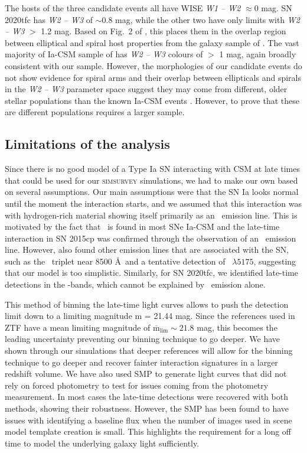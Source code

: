 \documentclass[a4paper,oneside,12pt, class=Latex/Classes/PhDthesisPSnPDF, crop=false]{standalone}
\begin{document}
The hosts of the three candidate events all have WISE \textit{W1 -- W2} $\approx0$ mag. SN 2020tfc has \textit{W2 -- W3} of $\sim$0.8 mag, while the other two have only limits with \textit{W2 -- W3} $>$ 1.2 mag. Based on Fig.~2 of \cite{Irani_wise}, this places them in the overlap region between elliptical and spiral host properties from the galaxy sample of \cite{Lintott_galaxyzoo}. The vast majority of Ia-CSM sample of \cite{Ia-CSM_BTS} has \textit{W2 -- W3} colours of $>$ 1 mag, again broadly consistent with our sample. However, the morphologies of our candidate events do not show evidence for spiral arms and their overlap between ellipticals and spirals in the \textit{W2 -- W3} parameter space suggest they may come from different, older stellar populations than the known Ia-CSM events \citep{Kool_He_CSM, Ia-CSM_BTS}. However, to prove that these are different populations requires a larger sample. 

\subsection{Limitations of the analysis}
Since there is no good model of a Type Ia SN interacting with CSM at late times that could be used for our \textsc{simsurvey} simulations, we had to make our own based on several assumptions. Our main assumptions were that the SN Ia looks normal until the moment the interaction starts, and we assumed that this interaction was with hydrogen-rich material showing itself primarily as an \Halpha~emission line. This is motivated by the fact that \Halpha~is found in most SNe Ia-CSM and the late-time interaction in SN 2015cp was confirmed through the observation of an \Halpha~emission line. However, \citet{2015cp} also found other emission lines that are associated with the SN, such as the \CaII~triplet near 8500 \AA~and a tentative detection of \MgI~$\lambda5175$, suggesting that our model is too simplistic. Similarly, for SN 2020tfc, we identified late-time detections in the \ztfg\ztfr\ztfi-bands, which cannot be explained by \Halpha~emission alone. 

This method of binning the late-time light curves allows to push the detection limit down to a limiting magnitude m = 21.44 mag. Since the references used in ZTF have a mean limiting magnitude of $\overline{\text{m}}_\text{lim} \sim 21.8$ mag, this becomes the leading uncertainty preventing our binning technique to go deeper. We have shown through our simulations that deeper references will allow for the binning technique to go deeper and recover fainter interaction signatures in a larger redshift volume. We have also used SMP to generate light curves that did not rely on forced photometry to test for issues coming from the photometry measurement. In most cases the late-time detections were recovered with both methods, showing their robustness. However, the SMP has been found to have issues with identifying a baseline flux when the number of images used in scene model template creation is small. This highlights the requirement for a long off time to model the underlying galaxy light sufficiently. 
\end{document}
